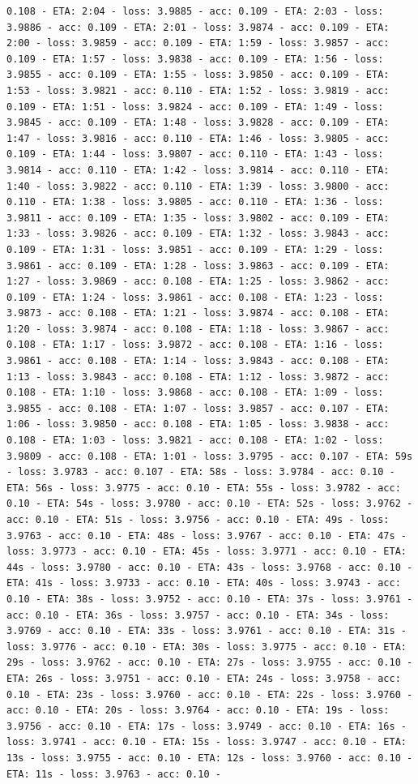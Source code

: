 \documentclass[11pt]{article}
\begin{document}
\begin{Verbatim}[commandchars=\\\{\}]
0.108 - ETA: 2:04 - loss: 3.9885 - acc: 0.109 - ETA: 2:03 - loss: 3.9886 - acc: 0.109 - ETA: 2:01 - loss: 3.9874 - acc: 0.109 - ETA: 2:00 - loss: 3.9859 - acc: 0.109 - ETA: 1:59 - loss: 3.9857 - acc: 0.109 - ETA: 1:57 - loss: 3.9838 - acc: 0.109 - ETA: 1:56 - loss: 3.9855 - acc: 0.109 - ETA: 1:55 - loss: 3.9850 - acc: 0.109 - ETA: 1:53 - loss: 3.9821 - acc: 0.110 - ETA: 1:52 - loss: 3.9819 - acc: 0.109 - ETA: 1:51 - loss: 3.9824 - acc: 0.109 - ETA: 1:49 - loss: 3.9845 - acc: 0.109 - ETA: 1:48 - loss: 3.9828 - acc: 0.109 - ETA: 1:47 - loss: 3.9816 - acc: 0.110 - ETA: 1:46 - loss: 3.9805 - acc: 0.109 - ETA: 1:44 - loss: 3.9807 - acc: 0.110 - ETA: 1:43 - loss: 3.9814 - acc: 0.110 - ETA: 1:42 - loss: 3.9814 - acc: 0.110 - ETA: 1:40 - loss: 3.9822 - acc: 0.110 - ETA: 1:39 - loss: 3.9800 - acc: 0.110 - ETA: 1:38 - loss: 3.9805 - acc: 0.110 - ETA: 1:36 - loss: 3.9811 - acc: 0.109 - ETA: 1:35 - loss: 3.9802 - acc: 0.109 - ETA: 1:33 - loss: 3.9826 - acc: 0.109 - ETA: 1:32 - loss: 3.9843 - acc: 0.109 - ETA: 1:31 - loss: 3.9851 - acc: 0.109 - ETA: 1:29 - loss: 3.9861 - acc: 0.109 - ETA: 1:28 - loss: 3.9863 - acc: 0.109 - ETA: 1:27 - loss: 3.9869 - acc: 0.108 - ETA: 1:25 - loss: 3.9862 - acc: 0.109 - ETA: 1:24 - loss: 3.9861 - acc: 0.108 - ETA: 1:23 - loss: 3.9873 - acc: 0.108 - ETA: 1:21 - loss: 3.9874 - acc: 0.108 - ETA: 1:20 - loss: 3.9874 - acc: 0.108 - ETA: 1:18 - loss: 3.9867 - acc: 0.108 - ETA: 1:17 - loss: 3.9872 - acc: 0.108 - ETA: 1:16 - loss: 3.9861 - acc: 0.108 - ETA: 1:14 - loss: 3.9843 - acc: 0.108 - ETA: 1:13 - loss: 3.9843 - acc: 0.108 - ETA: 1:12 - loss: 3.9872 - acc: 0.108 - ETA: 1:10 - loss: 3.9868 - acc: 0.108 - ETA: 1:09 - loss: 3.9855 - acc: 0.108 - ETA: 1:07 - loss: 3.9857 - acc: 0.107 - ETA: 1:06 - loss: 3.9850 - acc: 0.108 - ETA: 1:05 - loss: 3.9838 - acc: 0.108 - ETA: 1:03 - loss: 3.9821 - acc: 0.108 - ETA: 1:02 - loss: 3.9809 - acc: 0.108 - ETA: 1:01 - loss: 3.9795 - acc: 0.107 - ETA: 59s - loss: 3.9783 - acc: 0.107 - ETA: 58s - loss: 3.9784 - acc: 0.10 - ETA: 56s - loss: 3.9775 - acc: 0.10 - ETA: 55s - loss: 3.9782 - acc: 0.10 - ETA: 54s - loss: 3.9780 - acc: 0.10 - ETA: 52s - loss: 3.9762 - acc: 0.10 - ETA: 51s - loss: 3.9756 - acc: 0.10 - ETA: 49s - loss: 3.9763 - acc: 0.10 - ETA: 48s - loss: 3.9767 - acc: 0.10 - ETA: 47s - loss: 3.9773 - acc: 0.10 - ETA: 45s - loss: 3.9771 - acc: 0.10 - ETA: 44s - loss: 3.9780 - acc: 0.10 - ETA: 43s - loss: 3.9768 - acc: 0.10 - ETA: 41s - loss: 3.9733 - acc: 0.10 - ETA: 40s - loss: 3.9743 - acc: 0.10 - ETA: 38s - loss: 3.9752 - acc: 0.10 - ETA: 37s - loss: 3.9761 - acc: 0.10 - ETA: 36s - loss: 3.9757 - acc: 0.10 - ETA: 34s - loss: 3.9769 - acc: 0.10 - ETA: 33s - loss: 3.9761 - acc: 0.10 - ETA: 31s - loss: 3.9776 - acc: 0.10 - ETA: 30s - loss: 3.9775 - acc: 0.10 - ETA: 29s - loss: 3.9762 - acc: 0.10 - ETA: 27s - loss: 3.9755 - acc: 0.10 - ETA: 26s - loss: 3.9751 - acc: 0.10 - ETA: 24s - loss: 3.9758 - acc: 0.10 - ETA: 23s - loss: 3.9760 - acc: 0.10 - ETA: 22s - loss: 3.9760 - acc: 0.10 - ETA: 20s - loss: 3.9764 - acc: 0.10 - ETA: 19s - loss: 3.9756 - acc: 0.10 - ETA: 17s - loss: 3.9749 - acc: 0.10 - ETA: 16s - loss: 3.9741 - acc: 0.10 - ETA: 15s - loss: 3.9747 - acc: 0.10 - ETA: 13s - loss: 3.9755 - acc: 0.10 - ETA: 12s - loss: 3.9760 - acc: 0.10 - ETA: 11s - loss: 3.9763 - acc: 0.10 - 
\end{Verbatim}
\end{document}
